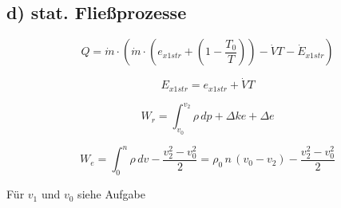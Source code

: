 \subsection*{d) stat. Fließprozesse}

\[
Q = \dot{m} \cdot \left( \dot{m} \cdot \left( e_{x1str} + (1 - \frac{T_0}{T}) \right) - \dot{V} T - \dot{E}_{x1str} \right)
\]

\[
E_{x1str} = e_{x1str} + \dot{V} T
\]

\[
W_r = \int_{v_0}^{v_2} \rho \, dp + \Delta ke + \Delta e
\]

\[
W_e = \int_{0}^{n} \rho \, dv - \frac{v_2^2 - v_0^2}{2} = \rho_0 \, n \, (v_0 - v_2) - \frac{v_2^2 - v_0^2}{2}
\]

Für \(v_1\) und \(v_0\) siehe Aufgabe